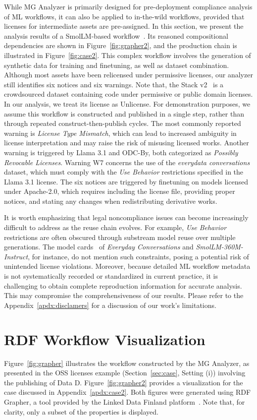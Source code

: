 While MG Analyzer is primarily designed for pre-deployment compliance analysis of ML workflows, it can also be applied to in-the-wild workflows, provided that licenses for intermediate assets are pre-assigned.
In this section, we present the analysis results of a SmolLM-based workflow~\cite{allal2024SmolLM}. 
Its reasoned compositional dependencies are shown in Figure~\ref{fig:grapher2}, and the production chain is illustrated in Figure~\ref{fig:case2}.
This complex workflow involves the generation of synthetic data for training and finetuning, as well as dataset combination.
Although most assets have been relicensed under permissive licenses, our analyzer still identifies six notices and six warnings. 
Note that, the Stack v2~\cite{lozhkov2024starcoder} is a crowdsourced dataset containing code under permissive or public domain licenses. In our analysis, we treat its license as Unlicense. For demonstration purposes, we assume this workflow is constructed and published in a single step, rather than through repeated construct-then-publish cycles.
The most commonly reported warning is \emph{License Type Mismatch}, which can lead to increased ambiguity in license interpretation and may raise the risk of misusing licensed works.
Another warning is triggered by Llama 3.1 and ODC-By, both categorized as \emph{Possibly Revocable Licenses}.
Warning W7 concerns the use of the \emph{everydata conversations} dataset, which must comply with the \emph{Use Behavior} restrictions specified in the Llama 3.1 license.
The six notices are triggered by finetuning on models licensed under Apache-2.0, which requires including the license file, providing proper notices, and stating any changes when redistributing derivative works.

It is worth emphasizing that legal noncompliance issues can become increasingly difficult to address as the reuse chain evolves. For example, \emph{Use Behavior} restrictions are often obscured through substream model reuse over multiple generations. The model cards~\cite{mitchell2019model} of \emph{Everyday Conversations} and \emph{SmolLM-360M-Instruct}, for instance, do not mention such constraints, posing a potential risk of unintended license violations.
Moreover, because detailed ML workflow metadata is not systematically recorded or standardized in current practice, it is challenging to obtain complete reproduction information for accurate analysis. This may compromise the comprehensiveness of our results.
Please refer to the Appendix~\ref{apdx:disclamers} for a discussion of our work's limitations.

\section{RDF Workflow Visualization}
\label{apdx:grapher}
Figure~\ref{fig:grapher} illustrates the workflow constructed by the MG Analyzer, as presented in the OSS licenses example (Section~\ref{sec:case}, Setting (i)) involving the publishing of Data D.
Figure~\ref{fig:grapher2} provides a visualization for the case discussed in Appendix~\ref{apdx:case2}.
Both figures were generated using RDF Grapher, a tool provided by the Linked Data Finland platform~\cite{hyvonen2014linked}. Note that, for clarity, only a subset of the properties is displayed.